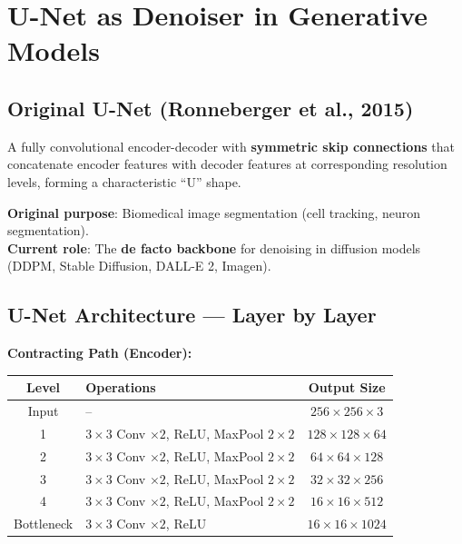 \section{U-Net as Denoiser in Generative Models}

\subsection{Original U-Net (Ronneberger et al., 2015)}

\begin{definition}[U-Net]
A fully convolutional encoder-decoder with \textbf{symmetric skip connections} that concatenate encoder features with decoder features at corresponding resolution levels, forming a characteristic ``U'' shape.
\end{definition}

\textbf{Original purpose}: Biomedical image segmentation (cell tracking, neuron segmentation).\\
\textbf{Current role}: The \textbf{de facto backbone} for denoising in diffusion models (DDPM, Stable Diffusion, DALL-E 2, Imagen).

\subsection{U-Net Architecture — Layer by Layer}

\textbf{Contracting Path (Encoder):}
\begin{center}\small
\begin{tabular}{clc}\toprule
\textbf{Level} & \textbf{Operations} & \textbf{Output Size} \\\midrule
Input & -- & $256 \times 256 \times 3$ \\
1 & $3{\times}3$ Conv $\times 2$, ReLU, MaxPool $2{\times}2$ & $128 \times 128 \times 64$ \\
2 & $3{\times}3$ Conv $\times 2$, ReLU, MaxPool $2{\times}2$ & $64 \times 64 \times 128$ \\
3 & $3{\times}3$ Conv $\times 2$, ReLU, MaxPool $2{\times}2$ & $32 \times 32 \times 256$ \\
4 & $3{\times}3$ Conv $\times 2$, ReLU, MaxPool $2{\times}2$ & $16 \times 16 \times 512$ \\
Bottleneck & $3{\times}3$ Conv $\times 2$, ReLU & $16 \times 16 \times 1024$ \\
\bottomrule
\end{tabular}
\end{center}

